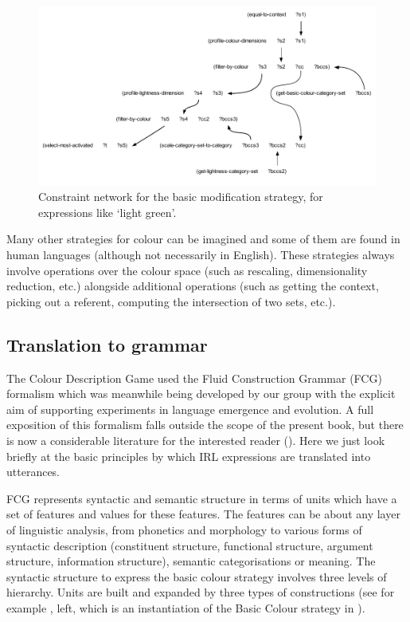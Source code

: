 \begin{figure}[htbp]
  \centerline{\includegraphics[width=1.0\textwidth]{chap11/figs/modi.pdf}}
\caption{\label{fig:modi}Constraint network for the basic modification strategy, for expressions like `light green'.}
\end{figure}

Many other strategies for colour can be imagined and some of them are found in human languages (although not necessarily in English). 
These strategies always involve operations over the colour space (such as rescaling, dimensionality reduction, etc.) alongside 
additional operations (such as getting the context, picking out a referent, computing the intersection of two sets, etc.).

\subsection{Translation to grammar}

The Colour Description Game used the Fluid Construction Grammar (FCG) formalism which was meanwhile being developed by our 
group with the explicit aim of supporting experiments in language emergence and evolution. A full exposition of this 
formalism falls outside the scope of the present book, but there is now a considerable literature for the interested 
reader (\cite{Steels:2011}). Here we just look briefly at the basic principles by which IRL 
expressions are translated into utterances. 

FCG represents syntactic and semantic structure in terms of units which have a set of features and values for these 
features. The features can be about any layer of linguistic analysis, from phonetics and morphology to various 
forms of syntactic description (constituent structure, functional structure, argument structure, information structure), 
semantic categorisations or meaning. 
The syntactic structure to express the basic colour strategy involves three levels of hierarchy. Units are built 
and expanded by three types of constructions (see for example , left, which is an instantiation of 
the Basic Colour strategy in ). 

